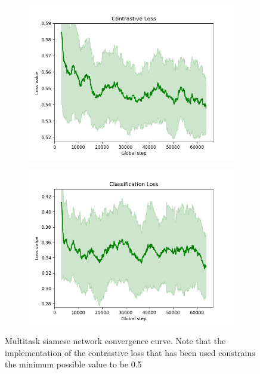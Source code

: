 \begin{figure}[h!]
    \centering
    \captionsetup{justification=centering}
    \begin{subfigure}[t]{\textwidth}
        \includegraphics[width=\textwidth]{./pictures/contrastive-loss}
    \end{subfigure}\vspace{3mm}
    \begin{subfigure}[t]{\textwidth}
        \includegraphics[width=\textwidth]{./pictures/classification-loss}
    \end{subfigure}
    \caption{Multitask siamese network convergence curve. Note that the implementation of the contrastive loss that has been used constrains the minimum possible value to be 0.5}
    \label{fig:siamese-training}
\end{figure}
\clearpage
